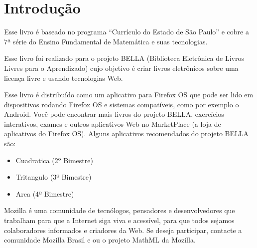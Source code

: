 \section*{Introdução}

Esse livro é baseado no programa ``Currículo do Estado de São Paulo''
e cobre a 7ª série do Ensino Fundamental de Matemática e suas tecnologias.

Esse livro foi realizado para o projeto BELLA
(Biblioteca Eletrônica de Livros Livres para o Aprendizado) cujo objetivo
é criar livros eletrônicos sobre uma licença livre e usando tecnologias Web.

Esse livro é distribuído como um aplicativo para Firefox OS que pode ser lido em
dispositivos rodando Firefox OS e sistemas compatíveis, como por exemplo o
Android. Você pode encontrar mais livros do projeto BELLA, exercícios
interativos, exames e outros aplicativos Web no MarketPlace (a loja de
aplicativos do Firefox OS). Alguns aplicativos recomendados do projeto BELLA
são:

\begin{itemize}
\item Cuadratica (2º Bimestre)
\item Tritangulo (3º Bimestre)
\item Area (4º Bimestre)
\end{itemize}

Mozilla é uma comunidade de tecnólogos, pensadores e desenvolvedores que
trabalham para que a Internet siga viva e acessível, para que todos sejamos
colaboradores informados e criadores da Web. Se deseja participar, contacte a
comunidade Mozilla Brasil e ou o projeto MathML da Mozilla.
